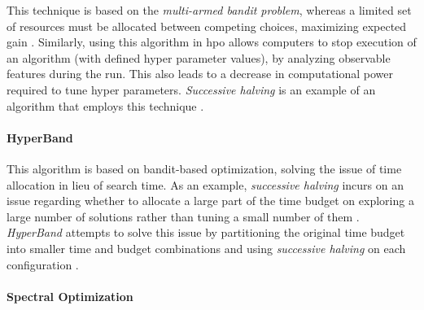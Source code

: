 This technique is based on the \textit{multi-armed bandit problem}, whereas a limited set of resources must be allocated between competing choices, maximizing expected gain \parencite{Katehakis1987TheMB}. Similarly, using this algorithm in \acrshort{hpo} allows computers to stop execution of an algorithm (with defined hyper parameter values), by analyzing observable features during the run. This also leads to a decrease in computational power required to tune hyper parameters. \textit{Successive halving} is an example of an algorithm that employs this technique \parencite{jamieson2015nonstochastic}.

\paragraph{HyperBand}

This algorithm is based on bandit-based optimization, solving the issue of time allocation in lieu of search time. As an example, \textit{successive halving} incurs on an issue regarding whether to allocate a large part of the time budget on exploring a large number of solutions rather than tuning a small number of them \parencite{elshawi2019automated}. \textit{HyperBand} attempts to solve this issue by partitioning the original time budget into smaller time and budget combinations and using \textit{successive halving} on each configuration \parencite{li2016hyperband}.

\paragraph{Spectral Optimization}

